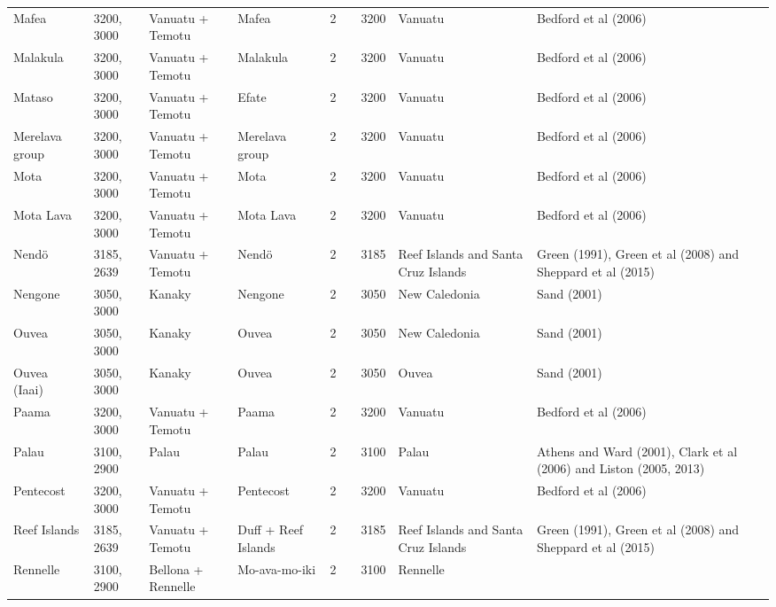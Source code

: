 \begin{longtable}{p{2cm}p{2cm}p{2cm}p{2cm}p{2cm}p{2cm}p{2cm}p{2cm}p{2cm}p{2cm}}
  Mafea & 3200, 3000 & Vanuatu + Temotu & Mafea & 2 &  & 3200 & Vanuatu & Bedford et al (2006) & \citet{rieth_cochrane_2018} \\ 
  Malakula & 3200, 3000 & Vanuatu + Temotu & Malakula & 2 &  & 3200 & Vanuatu & Bedford et al (2006) & \citet{rieth_cochrane_2018} \\ 
  Mataso & 3200, 3000 & Vanuatu + Temotu & Efate & 2 &  & 3200 & Vanuatu & Bedford et al (2006) & \citet{rieth_cochrane_2018} \\ 
  Merelava group & 3200, 3000 & Vanuatu + Temotu & Merelava group & 2 &  & 3200 & Vanuatu & Bedford et al (2006) & \citet{rieth_cochrane_2018} \\ 
  Mota & 3200, 3000 & Vanuatu + Temotu & Mota & 2 &  & 3200 & Vanuatu & Bedford et al (2006) & \citet{rieth_cochrane_2018} \\ 
  Mota Lava & 3200, 3000 & Vanuatu + Temotu & Mota Lava & 2 &  & 3200 & Vanuatu & Bedford et al (2006) & \citet{rieth_cochrane_2018} \\ 
  Nendö & 3185, 2639 & Vanuatu + Temotu & Nendö & 2 &  & 3185 & Reef Islands and Santa Cruz Islands & Green (1991), Green et al (2008) and Sheppard et al (2015) & \citet{rieth_cochrane_2018} \\ 
  Nengone & 3050, 3000 & Kanaky & Nengone & 2 &  & 3050 & New Caledonia & Sand (2001) & \citet{rieth_cochrane_2018} \\ 
  Ouvea & 3050, 3000 & Kanaky & Ouvea & 2 &  & 3050 & New Caledonia & Sand (2001) & \citet{rieth_cochrane_2018} \\ 
  Ouvea (Iaai) & 3050, 3000 & Kanaky & Ouvea & 2 &  & 3050 & Ouvea & Sand (2001) & \citet{rieth_cochrane_2018} \\ 
  Paama & 3200, 3000 & Vanuatu + Temotu & Paama & 2 &  & 3200 & Vanuatu & Bedford et al (2006) & \citet{rieth_cochrane_2018} \\ 
  Palau & 3100, 2900 & Palau & Palau & 2 &  & 3100 & Palau & Athens and Ward (2001), Clark et al (2006) and Liston (2005, 2013) & \citet{rieth_cochrane_2018} \\ 
  Pentecost & 3200, 3000 & Vanuatu + Temotu & Pentecost & 2 &  & 3200 & Vanuatu & Bedford et al (2006) & \citet{rieth_cochrane_2018} \\ 
  Reef Islands & 3185, 2639 & Vanuatu + Temotu & Duff + Reef Islands & 2 &  & 3185 & Reef Islands and Santa Cruz Islands & Green (1991), Green et al (2008) and Sheppard et al (2015) & \citet{rieth_cochrane_2018} \\ 
  Rennelle & 3100, 2900 & Bellona + Rennelle & Mo-ava-mo-iki & 2 &  & 3100 & Rennelle & \citet{carson2012recent} &  \\ 

\end{longtable}
